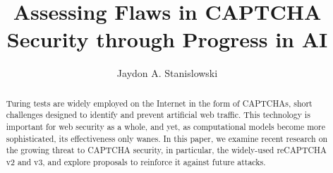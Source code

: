 \documentclass[sigplan,screen,nonacm]{acmart-tagged}
\begin{document}
\title{Assessing Flaws in CAPTCHA Security through Progress in AI}

\author{Jaydon A. Stanislowski}


\begin{abstract}
Turing tests are widely employed on the Internet in the form of CAPTCHAs, short challenges designed to identify and prevent artificial web traffic. This technology is important for web security as a whole, and yet, as computational models become more sophisticated, its effectiveness only wanes. In this paper, we examine recent research on the growing threat to CAPTCHA security, in particular, the widely-used reCAPTCHA v2 and v3, and explore proposals to reinforce it against future attacks.
\end{abstract}

\doclicenseThis



\maketitle
\end{document}
